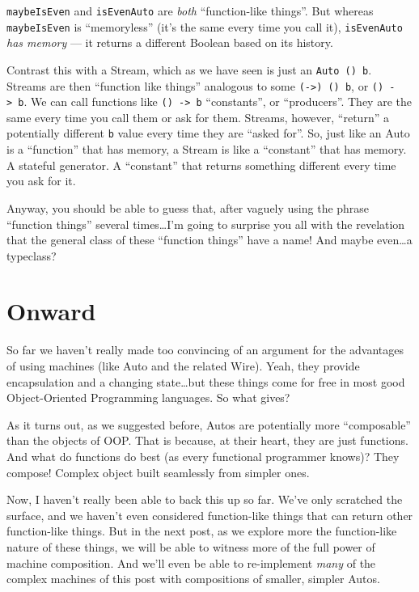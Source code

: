 \documentclass[]{article}
\begin{document}
\texttt{maybeIsEven} and \texttt{isEvenAuto} are \emph{both} ``function-like
things''. But whereas \texttt{maybeIsEven} is ``memoryless'' (it's the same
every time you call it), \texttt{isEvenAuto} \emph{has memory} --- it returns a
different Boolean based on its history.

Contrast this with a Stream, which as we have seen is just an
\texttt{Auto\ ()\ b}. Streams are then ``function like things'' analogous to
some \texttt{(-\textgreater{})\ ()\ b}, or \texttt{()\ -\textgreater{}\ b}. We
can call functions like \texttt{()\ -\textgreater{}\ b} ``constants'', or
``producers''. They are the same every time you call them or ask for them.
Streams, however, ``return'' a potentially different \texttt{b} value every time
they are ``asked for''. So, just like an Auto is a ``function'' that has memory,
a Stream is like a ``constant'' that has memory. A stateful generator. A
``constant'' that returns something different every time you ask for it.

Anyway, you should be able to guess that, after vaguely using the phrase
``function things'' several times\ldots{}I'm going to surprise you all with the
revelation that the general class of these ``function things'' have a name! And
maybe even\ldots{}a typeclass?

\hypertarget{onward}{%
\section{Onward}\label{onward}}

So far we haven't really made too convincing of an argument for the advantages
of using machines (like Auto and the related Wire). Yeah, they provide
encapsulation and a changing state\ldots{}but these things come for free in most
good Object-Oriented Programming languages. So what gives?

As it turns out, as we suggested before, Autos are potentially more
``composable'' than the objects of OOP. That is because, at their heart, they
are just functions. And what do functions do best (as every functional
programmer knows)? They compose! Complex object built seamlessly from simpler
ones.

Now, I haven't really been able to back this up so far. We've only scratched the
surface, and we haven't even considered function-like things that can return
other function-like things. But in the next post, as we explore more the
function-like nature of these things, we will be able to witness more of the
full power of machine composition. And we'll even be able to re-implement
\emph{many} of the complex machines of this post with compositions of smaller,
simpler Autos.
\end{document}
